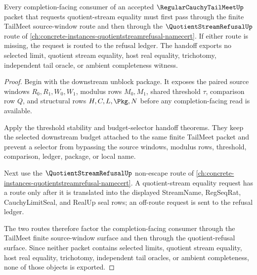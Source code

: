 \begin{theorem}
\label{thm:regular-cauchy-tail-meet-quotient-refusal-factorization}
Every completion-facing consumer of an accepted $\RegularCauchyTailMeetUp$
packet that requests quotient-stream equality must first pass through the finite
TailMeet source-window route and then through the $\QuotientStreamRefusalUp$
route of \autoref{ch:concrete-instances-quotientstreamrefusal-namecert}. If
either route is missing, the request is routed to the refusal ledger. The
handoff exports no selected limit, quotient stream equality, host real equality,
trichotomy, independent tail oracle, or ambient completeness witness.
\end{theorem}
\begin{proof}
Begin with the downstream unblock package. It exposes the paired source windows
$R_0,R_1,W_0,W_1$, modulus rows $M_0,M_1$, shared threshold $\tau$, comparison
row $Q$, and structural rows $H,C,L,\Pkg,N$ before any completion-facing read is
available.

Apply the threshold stability and budget-selector handoff theorems. They keep
the selected downstream budget attached to the same finite TailMeet packet and
prevent a selector from bypassing the source windows, modulus rows, threshold,
comparison, ledger, package, or local name.

Next use the $\QuotientStreamRefusalUp$ non-escape route of
\autoref{ch:concrete-instances-quotientstreamrefusal-namecert}. A
quotient-stream equality request has a route only after it is translated into
the displayed StreamName, RegSeqRat, CauchyLimitSeal, and RealUp seal rows; an
off-route request is sent to the refusal ledger.

The two routes therefore factor the completion-facing consumer through the
TailMeet finite source-window surface and then through the quotient-refusal
surface. Since neither packet contains selected limits, quotient stream
equality, host real equality, trichotomy, independent tail oracles, or ambient
completeness, none of those objects is exported.
\end{proof}

